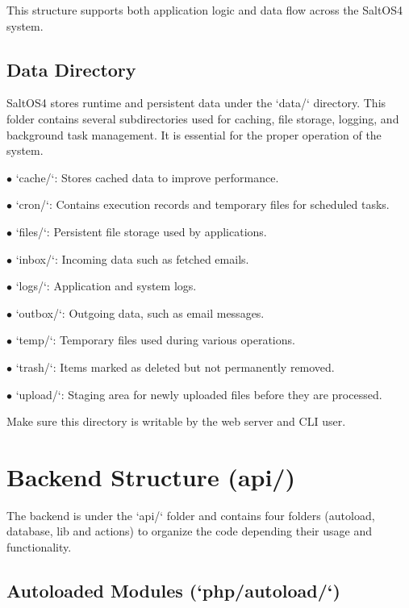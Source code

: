 \documentclass[a4paper]{article}
\begin{document}
This structure supports both application logic and data flow across the SaltOS4 system.

\hypertarget{toc5}{}
\subsection{Data Directory}

SaltOS4 stores runtime and persistent data under the `data/` directory. This folder contains several subdirectories used for caching, file storage, logging, and background task management. It is essential for the proper operation of the system.

\begin{compactitem}
\item[\color{myblue}$\bullet$] `cache/`: Stores cached data to improve performance.
\item[\color{myblue}$\bullet$] `cron/`: Contains execution records and temporary files for scheduled tasks.
\item[\color{myblue}$\bullet$] `files/`: Persistent file storage used by applications.
\item[\color{myblue}$\bullet$] `inbox/`: Incoming data such as fetched emails.
\item[\color{myblue}$\bullet$] `logs/`: Application and system logs.
\item[\color{myblue}$\bullet$] `outbox/`: Outgoing data, such as email messages.
\item[\color{myblue}$\bullet$] `temp/`: Temporary files used during various operations.
\item[\color{myblue}$\bullet$] `trash/`: Items marked as deleted but not permanently removed.
\item[\color{myblue}$\bullet$] `upload/`: Staging area for newly uploaded files before they are processed.
\end{compactitem}

Make sure this directory is writable by the web server and CLI user.


\hypertarget{toc6}{}
\section{Backend Structure (api/)}

The backend is under the `api/` folder and contains four folders (autoload, database, lib and actions) to organize the code depending their usage and functionality.

\hypertarget{toc7}{}
\subsection{Autoloaded Modules (`php/autoload/`)}
\end{document}
